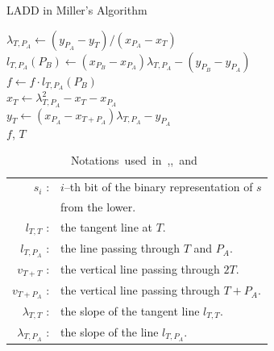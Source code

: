 \begin{algorithm}[ht]
	\caption{LADD in Miller's Algorithm}
	\label{algoADD}
	\DontPrintSemicolon
	$\lambda _{T,P_A} \leftarrow (y_{P_A}-y_{T})/(x_{P_A}-x_{T})$ \\
	$l_{T,P_A}(P_B) \leftarrow (x_{P_B}-x_{P_A})\lambda _{T,P_A}- (y_{P_B}-y_{P_A})$\\
	$f\leftarrow f\cdot l_{T,P_A}(P_B)$ \\
	$x_{T} \leftarrow \lambda _{T,P_A}^2-x_{T}-x_{P_A}$\\
	$y_{T} \leftarrow (x_{P_A}-x_{T+P_A})\lambda _{T,P_A}-y_{P_A}$\\
	 $f$, $T$\\
\end{algorithm}

\begin{table}[!ht]
	\vspace{6pt}
	\begin{center}
		\caption{\mbox{Notations used in ,, and }}
		\label{tbN1}
		\begin{tabular}{rl} \hline
			$s_i$ : & $i$--th bit of the binary representation of $s$\\
			& from the lower. \\
			$l_{T,T}$ : & the tangent line at $T$. \\
			$l_{T,P_A}$ : & the line passing through $T$ and $P_A$. \\
			$v_{T+T}$ : & the vertical line passing through $2T$. \\
			$v_{T+P_A}$ : & the vertical line passing through $T+P_A$. \\
			$\lambda_{T,T}$ : & the slope of the tangent line $l_{T,T}$.  \\
			$\lambda_{T,P_A}$ : & the slope of the line $l_{T,P_A}$.  \\ \hline
		\end{tabular}
	\end{center}
\end{table}


